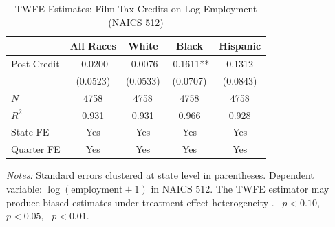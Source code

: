 \begin{table}[H]
\centering
\caption{TWFE Estimates: Film Tax Credits on Log Employment (NAICS 512)}
\label{tab:twfe}
\begin{threeparttable}
\begin{tabular}{lcccc}
\toprule
 & All Races & White & Black & Hispanic \\
\midrule
Post-Credit & -0.0200 & -0.0076 & -0.1611** & 0.1312 \\
 & (0.0523) & (0.0533) & (0.0707) & (0.0843) \\
\addlinespace
$N$ & 4758 & 4758 & 4758 & 4758 \\
$R^2$ & 0.931 & 0.931 & 0.966 & 0.928 \\
State FE & Yes & Yes & Yes & Yes \\
Quarter FE & Yes & Yes & Yes & Yes \\
\bottomrule
\end{tabular}
\begin{tablenotes}[flushleft]\small
\item \textit{Notes:} Standard errors clustered at state level in parentheses. Dependent variable: $\log(\text{employment} + 1)$ in NAICS 512. The TWFE estimator may produce biased estimates under treatment effect heterogeneity \citep{deChaisemartin2020, GoodmanBacon2021}. \sym{*}~$p<0.10$, \sym{**}~$p<0.05$, \sym{***}~$p<0.01$.
\end{tablenotes}
\end{threeparttable}
\end{table}

